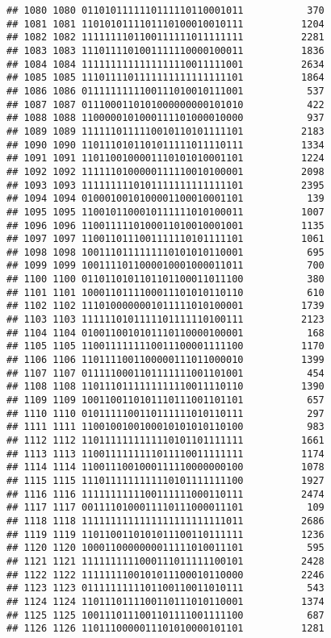 \documentclass[]{article}
\begin{document}
\begin{verbatim}
## 1080 1080 0110101111110111110110001011           370
## 1081 1081 1101010111101110100010010111          1204
## 1082 1082 1111111101100111111011111111          2281
## 1083 1083 1110111101001111110000100011          1836
## 1084 1084 1111111111111111110011111001          2634
## 1085 1085 1110111101111111111111111101          1864
## 1086 1086 0111111111100111010010111001           537
## 1087 1087 0111000110101000000000101010           422
## 1088 1088 1100000101000111101000010000           937
## 1089 1089 1111110111110010110101111101          2183
## 1090 1090 1101110101101011111011110111          1334
## 1091 1091 1101100100001110101010001101          1224
## 1092 1092 1111110100000111110010100001          2098
## 1093 1093 1111111110101111111111111101          2395
## 1094 1094 0100010010100001100010001101           139
## 1095 1095 1100101100010111111010100011          1007
## 1096 1096 1100111110100011010010001001          1135
## 1097 1097 1100110111001111110101111101          1061
## 1098 1098 1001110111111110101010110001           695
## 1099 1099 1001111011000010001000011011           700
## 1100 1100 0110110101101101100011011100           380
## 1101 1101 1000110111100011101010110110           610
## 1102 1102 1110100000001011111010100001          1739
## 1103 1103 1111110101111101111110100111          2123
## 1104 1104 0100110010101110110000100001           168
## 1105 1105 1100111111110011100001111100          1170
## 1106 1106 1101111001100000111011000010          1399
## 1107 1107 0111110001101111111001101001           454
## 1108 1108 1101110111111111110011110110          1390
## 1109 1109 1001100110101110111001101101           657
## 1110 1110 0101111100110111111010110111           297
## 1111 1111 1100100100100010101010110100           983
## 1112 1112 1101111111111110101101111111          1661
## 1113 1113 1100111111111011110011111111          1174
## 1114 1114 1100111001000111110000000100          1078
## 1115 1115 1110111111111110101111111100          1927
## 1116 1116 1111111111100111111000110111          2474
## 1117 1117 0011110100011110111000011101           109
## 1118 1118 1111111111111111111111111011          2686
## 1119 1119 1101100110101011100110111111          1236
## 1120 1120 1000110000000011111010011101           595
## 1121 1121 1111111111000111011111100101          2428
## 1122 1122 1111111100101011100010110000          2246
## 1123 1123 0111111111101100110011010111           543
## 1124 1124 1101110111100110111010110001          1374
## 1125 1125 1001110111001101111001111100           687
## 1126 1126 1101110000011101010000101101          1281

\end{verbatim}
\end{document}

